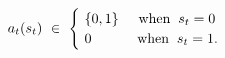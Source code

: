 \begin{equation}
    a_{t}(s_{t}) \ \in \ 
    \begin{cases}
        \ \{ 0, 1 \} \hspace{0.5cm} \text{when} \hspace{0.2cm} s_{t} = 0 \\ 
        \ 0 \hspace{1.15cm} \text{when} \hspace{0.2cm} s_{t} = 1.
    \end{cases}
\label{Equation:DCDP-Model_Constraints-of-Control-Variable}
\end{equation}